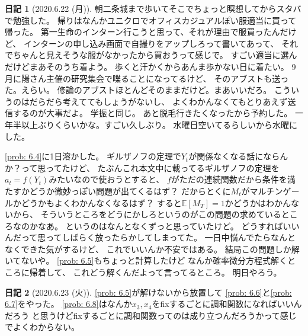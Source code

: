 \documentclass[uplatex]{jsarticle}
\theoremstyle{definition}
\newtheorem*{nikki*}{日記}
\def\E{\mathbb{E}}
\begin{document}
\begin{nikki*}[2020.6.22 (月)]
  朝二条城まで歩いてそこでちょっと瞑想してからスタバで勉強した。
  帰りはなんかユニクロでオフィスカジュアルぽい服適当に買って帰った。
  第一生命のインターン行こうと思って、それが理由で服買ったんだけど、
  インターンの申し込み画面で自撮りをアップしろって書いてあって、
  それでちゃんと見えそうな服がなかったから買おうって感じで。
  すごい適当に選んだけどまあそのうち着よう。
  歩くと汗かくからあんま歩かない日に着たい。
  9月に陽さん主催の研究集会で喋ることになってるけど、
  そのアブストも送った。えらい。
  修論のアブストほとんどそのままだけど。まあいいだろ。
  こういうのはだらだら考えててもしょうがないし、
  よくわかんなくてもとりあえず送信するのが大事だよ。
  学振と同じ。
  あと脱毛行きたくなったから予約した。
  一年半以上ぶりくらいかな。すごい久しぶり。
  水曜日空いてるらしいから水曜にした。

  \autoref{prob: 6.4}に1日溶かした。
  ギルザノフの定理で\(Y_t\)が関係なくなる話にならんか？って思ってたけど、
  たぶんこれ本文中に載ってるギルザノフの定理を
  \(a_t = f(Y_t)\)みたいなので使おうとすると、
  \(f\)がただの連続関数だから条件を満たすかどうか微妙っぽい問題が出てくるはず？
  だからとくに\(M_t\)がマルチンゲールかどうかもよくわかんなくなるはず？
  すると\(\E[M_T]=1\)かどうかはわかんないから、
  そういうところをどうにかしろというのがこの問題の求めているところなのかなあ。
  というのはなんとなくずっと思っていたけど。
  どうすればいいんだって思ってしばらく放ったらかしてしまってた。
  一日中悩んでたらなんとなくできた気がするけど、
  これでいいんか不安ではある。
  結局この問題しか解いてないや。
  \autoref{prob: 6.5}もちょっと計算したけど
  なんか確率微分方程式解くところに帰着して、
  これどう解くんだよって言ってるところ。
  明日やろう。
\end{nikki*}



\begin{nikki*}[2020.6.23 (火)]
  \autoref{prob: 6.5}が解けないから放置して
  \autoref{prob: 6.6}と\autoref{prob: 6.7}をやった。
  \autoref{prob: 6.8}はなんか\(x_3,x_4\)をfixするごとに調和関数になればいいんだろう
  と思うけどfixするごとに調和関数ってのは成り立つんだろうかって感じでよくわからない。
\end{nikki*}
\end{document}
